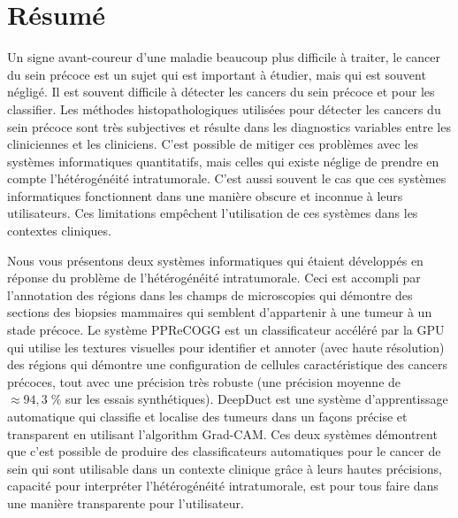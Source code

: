 \newpage
\section*{Résumé}

Un signe avant-coureur d’une maladie beaucoup plus difficile à traiter, 
le cancer du sein précoce est un sujet qui est important à étudier, mais 
qui est souvent négligé. Il est souvent difficile à détecter les cancers 
du sein précoce et pour les classifier. Les méthodes histopathologiques
utilisées pour détecter les cancers du sein précoce sont très subjectives
et résulte dans les diagnostics variables entre les cliniciennes et 
les cliniciens. C'est possible de mitiger ces problèmes avec les systèmes
informatiques quantitatifs, mais celles qui existe néglige de prendre
en compte l'hétérogénéité intratumorale. C'est aussi souvent le cas que 
ces systèmes informatiques fonctionnent dans une manière obscure et inconnue
à leurs utilisateurs. Ces limitations empêchent l'utilisation de ces systèmes
dans les contextes cliniques.

Nous vous présentons deux systèmes informatiques qui étaient développés en  
réponse du problème de l'hétérogénéité intratumorale. Ceci est accompli par  
l'annotation des régions dans les champs de microscopies qui démontre des 
sections des biopsies mammaires qui semblent d'appartenir à une tumeur à un
stade précoce. Le système {\guillemotleft PPReCOGG\guillemotright} est 
un classificateur accéléré par la GPU qui utilise les textures visuelles 
pour identifier et annoter (avec haute résolution) des régions qui démontre 
une configuration de cellules caractéristique des cancers précoces, tout 
avec une précision très robuste (une précision moyenne de $\approx94{,}3\;\%$ 
sur les essais synthétiques). {\guillemotleft DeepDuct\guillemotright} est 
une système d'apprentissage automatique qui classifie et localise des tumeurs
dans un façons précise et transparent en utilisant l'algorithm {\guillemotleft Grad-CAM\guillemotright}. Ces deux systèmes démontrent que c'est possible de 
produire des classificateurs automatiques pour le cancer de sein
qui sont utilisable dans un contexte clinique grâce à leurs hautes précisions, 
capacité pour interpréter l'hétérogénéité intratumorale, est pour tous faire
dans une manière transparente pour l'utilisateur.